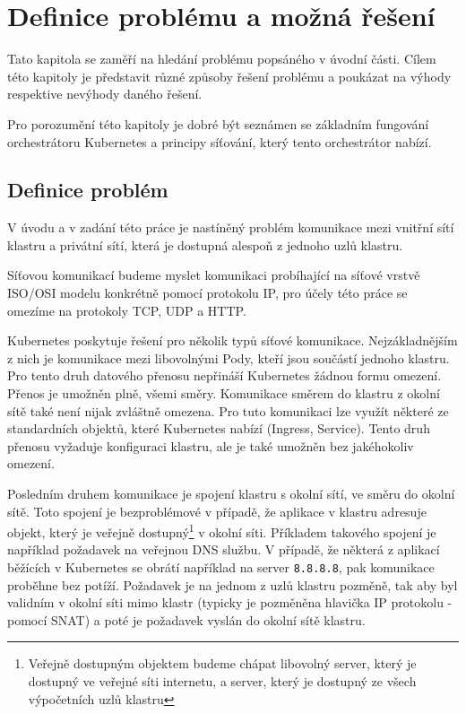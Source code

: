 \chapter{Definice problému a možná řešení}

\begin{chapterabstract}
Tato kapitola se zaměří na hledání problému popsáného v úvodní části. Cílem této kapitoly je představit různé způsoby řešení problému a poukázat na výhody respektive nevýhody daného řešení.

Pro porozumění této kapitoly je dobré být seznámen se základním fungování orchestrátoru Kubernetes a principy síťování, který tento orchestrátor nabízí.  
\end{chapterabstract}


\section{Definice problém}
V úvodu a v zadání této práce je nastíněný problém komunikace mezi vnitřní sítí klastru a privátní sítí, která je dostupná alespoň z jednoho uzlů klastru. 

Síťovou komunikací budeme myslet komunikaci probíhající na síťové vrstvě ISO/OSI modelu konkrétně pomocí protokolu IP, pro účely této práce se omezíme na protokoly TCP, UDP a HTTP.

Kubernetes poskytuje řešení pro několik typů síťové komunikace. Nejzákladnějším z nich je komunikace mezi libovolnými Pody, kteří jsou součástí jednoho klastru. Pro tento druh datového přenosu nepřináší Kubernetes žádnou formu omezení. Přenos je umožněn plně, všemi směry. Komunikace směrem do klastru z okolní sítě také není nijak zvláštně omezena. Pro tuto komunikaci lze využít některé ze standardních objektů, které Kubernetes nabízí (Ingress, Service). Tento druh přenosu vyžaduje konfiguraci klastru, ale je také umožněn bez jakéhokoliv omezení.

Posledním druhem komunikace je spojení klastru s okolní sítí, ve směru do okolní sítě. Toto spojení je bezproblémové v případě, že aplikace v klastru adresuje objekt, který je veřejně dostupný\footnote{Veřejně dostupným objektem budeme chápat libovolný server, který je dostupný ve veřejné síti internetu, a server, který je dostupný ze všech výpočetních uzlů klastru} v okolní síti. Příkladem takového spojení je například požadavek na veřejnou DNS službu. V případě, že některá z aplikací běžících v Kubernetes se obrátí například na server \verb|8.8.8.8|, pak komunikace proběhne bez potíží. Požadavek je na jednom z uzlů klastru pozměně, tak aby byl validním v okolní síti mimo klastr (typicky je pozměněna hlavička IP protokolu - pomocí SNAT) a poté je požadavek vyslán do okolní sítě klastru.

